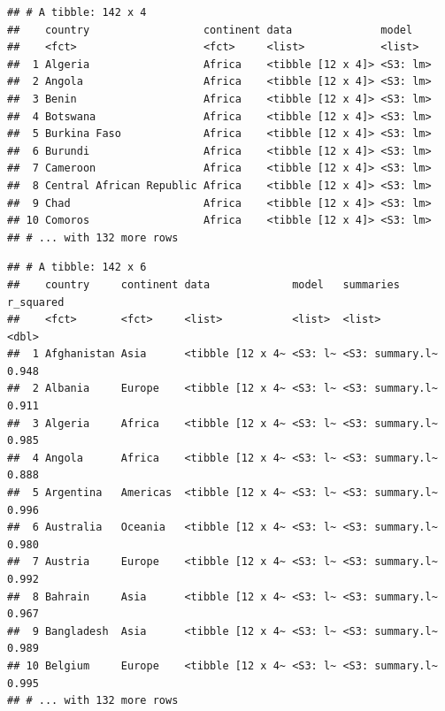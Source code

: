\documentclass[]{book}
\newenvironment{Shaded}{\begin{snugshade}}{\end{snugshade}}
\newcommand{\DataTypeTok}[1]{\textcolor[rgb]{0.13,0.29,0.53}{#1}}
\newcommand{\KeywordTok}[1]{\textcolor[rgb]{0.13,0.29,0.53}{\textbf{#1}}}
\newcommand{\NormalTok}[1]{#1}
\newcommand{\OperatorTok}[1]{\textcolor[rgb]{0.81,0.36,0.00}{\textbf{#1}}}
\newcommand{\StringTok}[1]{\textcolor[rgb]{0.31,0.60,0.02}{#1}}
\theoremstyle{definition}
\theoremstyle{definition}
\theoremstyle{definition}
\theoremstyle{remark}
\begin{document}
\begin{verbatim}
## # A tibble: 142 x 4
##    country                  continent data              model   
##    <fct>                    <fct>     <list>            <list>  
##  1 Algeria                  Africa    <tibble [12 x 4]> <S3: lm>
##  2 Angola                   Africa    <tibble [12 x 4]> <S3: lm>
##  3 Benin                    Africa    <tibble [12 x 4]> <S3: lm>
##  4 Botswana                 Africa    <tibble [12 x 4]> <S3: lm>
##  5 Burkina Faso             Africa    <tibble [12 x 4]> <S3: lm>
##  6 Burundi                  Africa    <tibble [12 x 4]> <S3: lm>
##  7 Cameroon                 Africa    <tibble [12 x 4]> <S3: lm>
##  8 Central African Republic Africa    <tibble [12 x 4]> <S3: lm>
##  9 Chad                     Africa    <tibble [12 x 4]> <S3: lm>
## 10 Comoros                  Africa    <tibble [12 x 4]> <S3: lm>
## # ... with 132 more rows
\end{verbatim}

\begin{Shaded}
\end{Shaded}

\begin{verbatim}
## # A tibble: 142 x 6
##    country     continent data             model   summaries       r_squared
##    <fct>       <fct>     <list>           <list>  <list>              <dbl>
##  1 Afghanistan Asia      <tibble [12 x 4~ <S3: l~ <S3: summary.l~     0.948
##  2 Albania     Europe    <tibble [12 x 4~ <S3: l~ <S3: summary.l~     0.911
##  3 Algeria     Africa    <tibble [12 x 4~ <S3: l~ <S3: summary.l~     0.985
##  4 Angola      Africa    <tibble [12 x 4~ <S3: l~ <S3: summary.l~     0.888
##  5 Argentina   Americas  <tibble [12 x 4~ <S3: l~ <S3: summary.l~     0.996
##  6 Australia   Oceania   <tibble [12 x 4~ <S3: l~ <S3: summary.l~     0.980
##  7 Austria     Europe    <tibble [12 x 4~ <S3: l~ <S3: summary.l~     0.992
##  8 Bahrain     Asia      <tibble [12 x 4~ <S3: l~ <S3: summary.l~     0.967
##  9 Bangladesh  Asia      <tibble [12 x 4~ <S3: l~ <S3: summary.l~     0.989
## 10 Belgium     Europe    <tibble [12 x 4~ <S3: l~ <S3: summary.l~     0.995
## # ... with 132 more rows
\end{verbatim}
\end{document}
